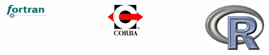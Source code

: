 \documentclass[compress=true]{beamer}
\begin{document}
\begin{frame}
\begin{itemize}
\begin{columns}
\begin{column}{0.4\textwidth}
				\end{column}
			\end{columns}
			\begin{columns}
				\begin{column}{0.3\textwidth}
					\begin{figure}
						\includegraphics[height=0.1\textheight]{fortran.png}
					\end{figure}
				\end{column}
				\begin{column}{0.3\textwidth}
					\begin{figure}
						\includegraphics[height=0.2\textheight]{CORBA.png}
					\end{figure}
				\end{column}
				\begin{column}{0.4\textwidth}
					\begin{figure}
						\includegraphics[height=0.2\textheight]{r.png}
					\end{figure}
				\end{column}
			\end{columns}
	\end{itemize}
\end{frame}
\end{document}
